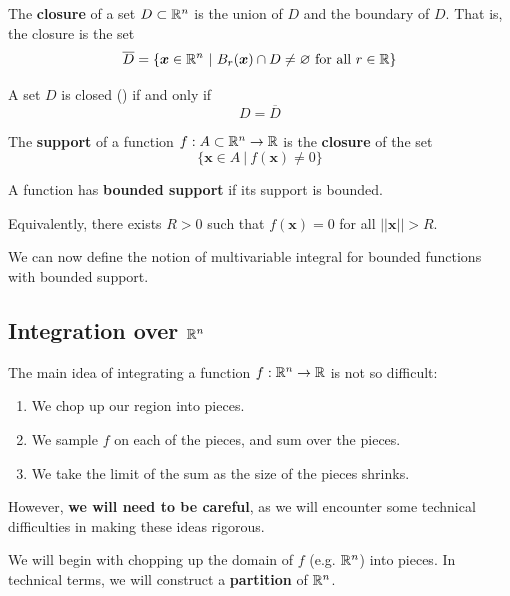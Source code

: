     \begin{definition}
    The \textbf{closure} of a set $D \subset \mathbb{R}^n$ is the union of $D$ and the boundary of $D$.  That is, the closure is the set $$\overline{D} = \{\bm{x} \in \R^n \ | \ B_r(\bm{x}) \cap D \neq \varnothing \textnormal{ for all } r\in\R \}$$  
    \end{definition}

\begin{proposition}
    A set $D$ is closed () if and only if $$D = \overline{D}$$
\end{proposition}

\begin{definition}
    The \textbf{support} of a function $f : A \subset \mathbb{R}^n \to \mathbb{R}$ is the \textbf{closure} of the set $$\{\bm{x} \in A \ | \ f(\bm{x}) \neq 0\}$$
\end{definition}

\begin{definition}
    A function has \textbf{bounded support} if its support is bounded.  

    Equivalently, there exists $R>0$ such that $f(\bm{x}) = 0$ for all $||\bm{x}|| > R$.
    \end{definition}

We can now define the notion of multivariable integral for bounded functions with bounded support.  


\subsection{Integration over $\mathbb{R}^n$}

The main idea of integrating a function $f: \mathbb{R}^n \to \mathbb{R}$ is not so difficult: 

\begin{enumerate}
    \item We chop up our region into pieces.
    \item We sample $f$ on each of the pieces, and sum over the pieces.
    \item We take the limit of the sum as the size of the pieces shrinks.
\end{enumerate}

However, \textbf{we will need to be careful}, as we will encounter some technical difficulties in making these ideas rigorous.


We will begin with chopping up the domain of $f$ (e.g. $\mathbb{R}^n$) into pieces.  In technical terms, we will construct a \textbf{partition} of $\mathbb{R}^n$.

